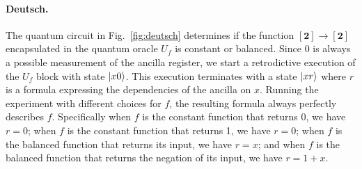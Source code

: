 \documentclass{article}
\newcommand{\finset}[1]{[\mathbf{#1}]}
\begin{document}
\begin{refsection}
\paragraph*{Deutsch.} The quantum circuit in Fig.~\ref{fig:deutsch} determines
if the function $\finset{2} \rightarrow \finset{2}$ encapsulated in
the quantum oracle $U_f$ is constant or balanced. Since 0 is always a
possible measurement of the ancilla register, we start a retrodictive
execution of the $U_f$ block with state $\ket{x0}$. This execution
terminates with a state $\ket{xr}$ where $r$ is a formula expressing
the dependencies of the ancilla on $x$. Running the experiment with
different choices for $f$, the resulting formula always perfectly
describes $f$. Specifically when $f$ is the constant function that
returns 0, we have $r=0$; when $f$ is the constant function that
returns 1, we have $r=0$; when $f$ is the balanced function that
returns its input, we have $r=x$; and when $f$ is the balanced function that
returns the negation of its input, we have $r=1+x$.


\end{refsection}
\end{document}
